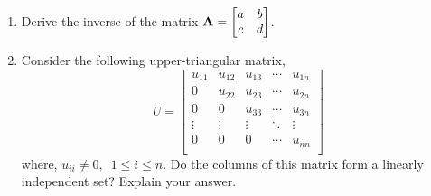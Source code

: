 \documentclass[9pt]{article}
\def\mf{\ensuremath\mathbf}
\begin{document}
\begin{multicols}{2}
\begin{enumerate}

    

    \item Derive the inverse of the matrix $\mf{A} = \begin{bmatrix}a & b\\c & d\end{bmatrix}$.
    
    \item Consider the following upper-triangular matrix, 
    $$U = \begin{bmatrix}
    u_{11} & u_{12} & u_{13} & \cdots & u_{1n}\\
    0 & u_{22} & u_{23} & \cdots & u_{2n}\\
    0 & 0 & u_{33} & \cdots & u_{3n}\\
    \vdots & \vdots & \vdots & \ddots & \vdots\\
    0 & 0 & 0 & \cdots & u_{nn}\\\end{bmatrix}$$
    where, $u_{ii} \neq 0, \,\,\, 1 \leq i \leq n$. Do the columns of this matrix form a linearly independent set? Explain your answer.


\end{enumerate}
\end{multicols}
\end{document}
